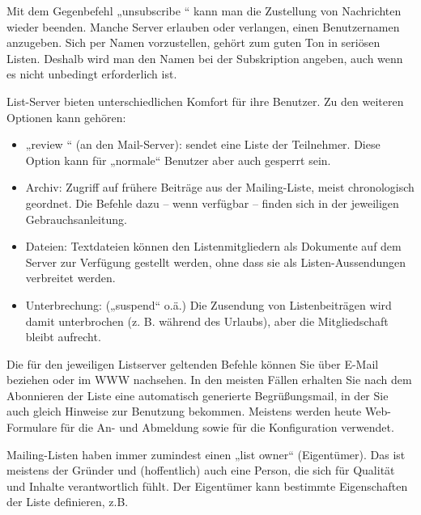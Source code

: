 \documentclass[]{book}
\providecommand{\tightlist}{%
  \setlength{\itemsep}{0pt}\setlength{\parskip}{0pt}}
\theoremstyle{definition}
\theoremstyle{definition}
\theoremstyle{definition}
\theoremstyle{remark}
\begin{document}
Mit dem Gegenbefehl „unsubscribe `` kann man die Zustellung von
Nachrichten wieder beenden. Manche Server erlauben oder verlangen, einen
Benutzernamen anzugeben. Sich per Namen vorzustellen, gehört zum guten
Ton in seriösen Listen. Deshalb wird man den Namen bei der Subskription
angeben, auch wenn es nicht unbedingt erforderlich ist.

List-Server bieten unterschiedlichen Komfort für ihre Benutzer. Zu den
weiteren Optionen kann gehören:

\begin{itemize}
\tightlist
\item
  „review `` (an den Mail-Server): sendet eine Liste der Teilnehmer.
  Diese Option kann für „normale`` Benutzer aber auch gesperrt sein.
\item
  Archiv: Zugriff auf frühere Beiträge aus der Mailing-Liste, meist
  chronologisch geordnet. Die Befehle dazu -- wenn verfügbar -- finden
  sich in der jeweiligen Gebrauchsanleitung.
\item
  Dateien: Textdateien können den Listenmitgliedern als Dokumente auf
  dem Server zur Verfügung gestellt werden, ohne dass sie als
  Listen-Aussendungen verbreitet werden.
\item
  Unterbrechung: („suspend`` o.ä.) Die Zusendung von Listenbeiträgen
  wird damit unterbrochen (z. B. während des Urlaubs), aber die
  Mitgliedschaft bleibt aufrecht.
\end{itemize}

Die für den jeweiligen Listserver geltenden Befehle können Sie über
E-Mail beziehen oder im WWW nachsehen. In den meisten Fällen erhalten
Sie nach dem Abonnieren der Liste eine automatisch generierte
Begrüßungsmail, in der Sie auch gleich Hinweise zur Benutzung bekommen.
Meistens werden heute Web-Formulare für die An- und Abmeldung sowie für
die Konfiguration verwendet.

Mailing-Listen haben immer zumindest einen „list owner`` (Eigentümer).
Das ist meistens der Gründer und (hoffentlich) auch eine Person, die
sich für Qualität und Inhalte verantwortlich fühlt. Der Eigentümer kann
bestimmte Eigenschaften der Liste definieren, z.B.
\end{document}
